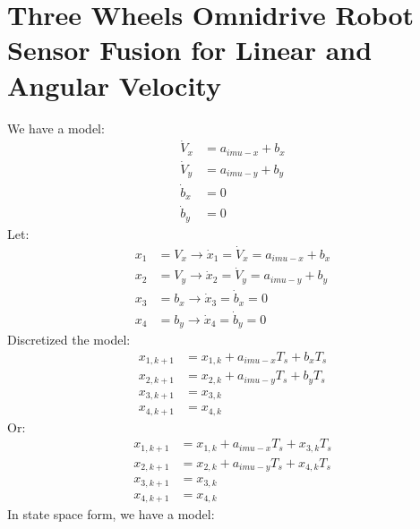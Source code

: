 \documentclass[12pt,a4paper]{article}
\begin{document}
	\section{Three Wheels Omnidrive Robot Sensor Fusion for Linear and Angular Velocity}
	We have a model:
	\begin{equation}
		\begin{split}
			\dot{V}_x &= a_{imu-x} + b_x \\
			\dot{V}_y &= a_{imu-y} + b_y \\
			\dot{b}_x &= 0 \\
			\dot{b}_y &= 0
		\end{split}
		\label{eq16}
	\end{equation}
	Let:
	\[\begin{split}
		x_1 &= V_x \rightarrow \dot{x}_1 = \dot{V}_x = a_{imu-x} + b_x \\
		x_2 &= V_y \rightarrow \dot{x}_2 = \dot{V}_y = a_{imu-y} + b_y \\
		x_3 &= b_x \rightarrow \dot{x}_3 = \dot{b}_x = 0 \\
		x_4 &= b_y \rightarrow \dot{x}_4 = \dot{b}_y = 0
	\end{split}\]
	Discretized the model:
	\[\begin{split}
		x_{1,k+1} &= x_{1,k} + a_{imu-x}T_s + b_xT_s \\
		x_{2,k+1} &= x_{2,k} + a_{imu-y}T_s + b_yT_s \\
		x_{3,k+1} &= x_{3,k} \\
		x_{4,k+1} &= x_{4,k}
	\end{split}\]
	Or:
	\[\begin{split}
		x_{1,k+1} &= x_{1,k} + a_{imu-x}T_s + x_{3,k}T_s \\
		x_{2,k+1} &= x_{2,k} + a_{imu-y}T_s + x_{4,k}T_s \\
		x_{3,k+1} &= x_{3,k} \\
		x_{4,k+1} &= x_{4,k}
	\end{split}\]
	In state space form, we have a model:
\end{document}

